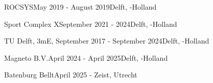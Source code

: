 \begin{rSection}{}
    \begin{experienceItem}
        {ROCSYS}{May 2019 - August 2019}{}{Delft, -Holland}
    \end{experienceItem}


    \begin{experienceItem}
        {Sport Complex X}{September 2021 -  2024}{}{Delft, -Holland}
    \end{experienceItem}

    \begin{experienceItem}
        {TU Delft, 3mE, }{September 2017 - September 2024}{}{Delft, -Holland}
    \end{experienceItem}

    \begin{experienceItem}
        {Magneto B.V.}{April 2024 - April 2025}{}{Delft, -Holland}
    \end{experienceItem}

    \begin{experienceItem}
        {Batenburg Bellt}{April 2025 - }{}{Zeist, Utrecht}
    \end{experienceItem}

\end{rSection}
